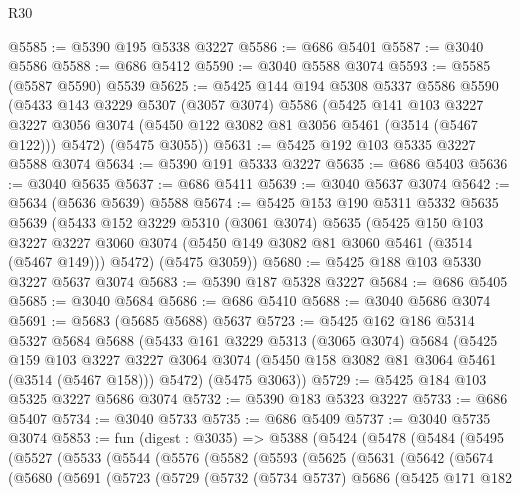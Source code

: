 \begin{lexlean}{R30}
\begin{coremodule}
@5585 := @5390 @195 @5338 @3227
@5586 := @686 @5401
@5587 := @3040 @5586
@5588 := @686 @5412
@5590 := @3040 @5588 @3074
@5593 := @5585 (@5587 @5590) @5539
@5625 := @5425
    @144
    @194
    @5308
    @5337
    @5586
    @5590
    (@5433
      @143
      @3229
      @5307
      (@3057 @3074)
      @5586
      (@5425
        @141
        @103
        @3227
        @3227
        @3056
        @3074
        (@5450 @122 @3082 @81 @3056 @5461 (@3514 (@5467 @122)))
        @5472)
      (@5475 @3055))
@5631 := @5425 @192 @103 @5335 @3227 @5588 @3074
@5634 := @5390 @191 @5333 @3227
@5635 := @686 @5403
@5636 := @3040 @5635
@5637 := @686 @5411
@5639 := @3040 @5637 @3074
@5642 := @5634 (@5636 @5639) @5588
@5674 := @5425
    @153
    @190
    @5311
    @5332
    @5635
    @5639
    (@5433
      @152
      @3229
      @5310
      (@3061 @3074)
      @5635
      (@5425
        @150
        @103
        @3227
        @3227
        @3060
        @3074
        (@5450 @149 @3082 @81 @3060 @5461 (@3514 (@5467 @149)))
        @5472)
      (@5475 @3059))
@5680 := @5425 @188 @103 @5330 @3227 @5637 @3074
@5683 := @5390 @187 @5328 @3227
@5684 := @686 @5405
@5685 := @3040 @5684
@5686 := @686 @5410
@5688 := @3040 @5686 @3074
@5691 := @5683 (@5685 @5688) @5637
@5723 := @5425
    @162
    @186
    @5314
    @5327
    @5684
    @5688
    (@5433
      @161
      @3229
      @5313
      (@3065 @3074)
      @5684
      (@5425
        @159
        @103
        @3227
        @3227
        @3064
        @3074
        (@5450 @158 @3082 @81 @3064 @5461 (@3514 (@5467 @158)))
        @5472)
      (@5475 @3063))
@5729 := @5425 @184 @103 @5325 @3227 @5686 @3074
@5732 := @5390 @183 @5323 @3227
@5733 := @686 @5407
@5734 := @3040 @5733
@5735 := @686 @5409
@5737 := @3040 @5735 @3074
@5853 := fun (digest : @3035) =>
  @5388
    (@5424
      (@5478
        (@5484
          (@5495
            (@5527
              (@5533
                (@5544
                  (@5576
                    (@5582
                      (@5593
                        (@5625
                          (@5631
                            (@5642
                              (@5674
                                (@5680
                                  (@5691
                                    (@5723
                                      (@5729
                                        (@5732
                                          (@5734 @5737)
                                          @5686
                                          (@5425
                                            @171
                                            @182

\end{coremodule}
\end{lexlean}
